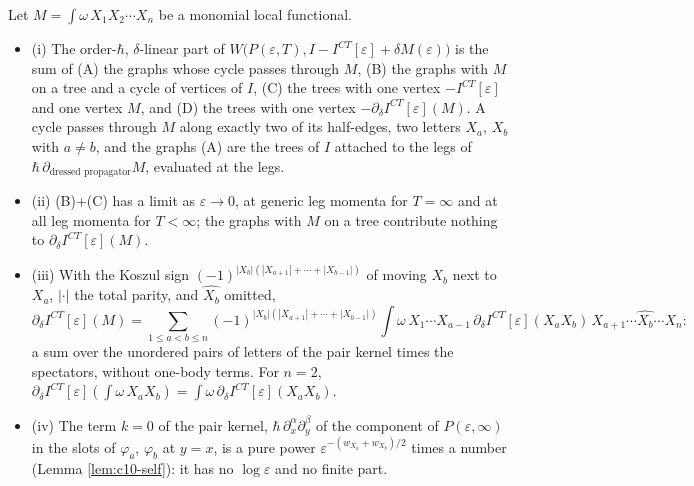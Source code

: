 \begin{theorem}[Decomposition]
\label{thm:c10-decomp}
Let $M=\int\omega\,X_1X_2\cdots X_n$ be a monomial local functional.
\begin{itemize}
\item (i) The order-$\hbar$, $\delta$-linear part of $W\big(P(\varepsilon,T),I-I^{CT}[\varepsilon]+\delta M(\varepsilon)\big)$ is the sum of (A) the graphs whose cycle passes through $M$, (B) the graphs with $M$ on a tree and a cycle of vertices of $I$, (C) the trees with one vertex $-I^{CT}[\varepsilon]$ and one vertex $M$, and (D) the trees with one vertex $-\partial_\delta I^{CT}[\varepsilon](M)$. A cycle passes through $M$ along exactly two of its half-edges, two letters $X_a$, $X_b$ with $a\ne b$, and the graphs (A) are the trees of $I$ attached to the legs of $\hbar\,\partial_{\text{dressed propagator}}M$, evaluated at the legs.
\item (ii) (B)$+$(C) has a limit as $\varepsilon\to0$, at generic leg momenta for $T=\infty$ and at all leg momenta for $T<\infty$; the graphs with $M$ on a tree contribute nothing to $\partial_\delta I^{CT}[\varepsilon](M)$.
\item (iii) With the Koszul sign $(-1)^{|X_b|(|X_{a+1}|+\cdots+|X_{b-1}|)}$ of moving $X_b$ next to $X_a$, $|\cdot|$ the total parity, and $\widehat{X_b}$ omitted,
\begin{equation}
\partial_\delta I^{CT}[\varepsilon](M)=\sum_{1\le a<b\le n}(-1)^{|X_b|(|X_{a+1}|+\cdots+|X_{b-1}|)}\int\omega\,X_1\cdots X_{a-1}\,\partial_\delta I^{CT}[\varepsilon](X_aX_b)\,X_{a+1}\cdots\widehat{X_b}\cdots X_n :
\label{eq:c10-decomp}
\end{equation}
a sum over the unordered pairs of letters of the pair kernel times the spectators, without one-body terms. For $n=2$, $\partial_\delta I^{CT}[\varepsilon](\int\omega\,X_aX_b)=\int\omega\,\partial_\delta I^{CT}[\varepsilon](X_aX_b)$.
\item (iv) The term $k=0$ of the pair kernel, $\hbar\,\partial^\alpha_x\partial^\beta_y$ of the component of $P(\varepsilon,\infty)$ in the slots of $\varphi_a$, $\varphi_b$ at $y=x$, is a pure power $\varepsilon^{-(w_{X_a}+w_{X_b})/2}$ times a number (Lemma \ref{lem:c10-self}): it has no $\log\varepsilon$ and no finite part.
\end{itemize}
\end{theorem}

